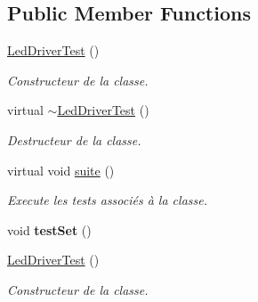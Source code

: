 \subsection*{Public Member Functions}
\begin{DoxyCompactItemize}
\item 
\mbox{\label{classtest_1_1LedDriverTest_ae8f1a38f3f439efaafacc2e6496b4748}} 
\hyperlink{classtest_1_1LedDriverTest_ae8f1a38f3f439efaafacc2e6496b4748}{Led\+Driver\+Test} ()
\begin{DoxyCompactList}\small\item\em Constructeur de la classe. \end{DoxyCompactList}\item 
\mbox{\label{classtest_1_1LedDriverTest_a30bad4fbcf62adb6670e98c477061317}} 
virtual \hyperlink{classtest_1_1LedDriverTest_a30bad4fbcf62adb6670e98c477061317}{$\sim$\+Led\+Driver\+Test} ()
\begin{DoxyCompactList}\small\item\em Destructeur de la classe. \end{DoxyCompactList}\item 
\mbox{\label{classtest_1_1LedDriverTest_a6bd5e29b244099fe0a20d7c97dbc3a61}} 
virtual void \hyperlink{classtest_1_1LedDriverTest_a6bd5e29b244099fe0a20d7c97dbc3a61}{suite} ()
\begin{DoxyCompactList}\small\item\em Execute les tests associés à la classe. \end{DoxyCompactList}\item 
\mbox{\label{classtest_1_1LedDriverTest_a7a97e869be2ac158b44f83f77193f659}} 
void {\bfseries test\+Set} ()
\item 
\mbox{\label{classtest_1_1LedDriverTest_ae8f1a38f3f439efaafacc2e6496b4748}} 
\hyperlink{classtest_1_1LedDriverTest_ae8f1a38f3f439efaafacc2e6496b4748}{Led\+Driver\+Test} ()
\begin{DoxyCompactList}\small\item\em Constructeur de la classe. \end{DoxyCompactList}\item 
\mbox{\label{classtest_1_1LedDriverTest_a30bad4fbcf62adb6670e98c477061317}} 

\end{DoxyCompactItemize}
